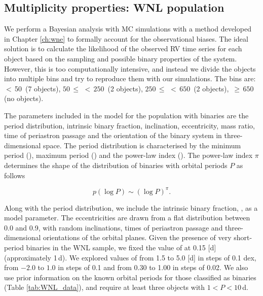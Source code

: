 \subsection{Multiplicity properties: WNL population} \label{sect:WNL_multiplicity}

We perform a Bayesian analysis with MC simulations with a method developed in Chapter \ref{ch:wne} to formally account for the observational biases. The ideal solution is to calculate the likelihood of the observed RV time series for each object based on the sampling and possible binary properties of the system. However, this is too computationally intensive, and instead we divide the objects into multiple \DelRV{} bins and try to reproduce them with our simulations. The \DelRV{} bins are: \DelRV{}\,$<$\,50\,\kms{} (7 objects), $50\,\le\,$\DelRV{}$\,<\,250\,$\kms{} (2 objects), $250\,\le\,$\DelRV{}$\,<\,650\,$\kms{} (2 objects), \DelRV{}\,$\ge\,650\,$\kms{} (no objects).

The parameters included in the model for the population with binaries are the period distribution, intrinsic binary fraction, inclination, eccentricity, mass ratio, time of periastron passage and the orientation of the binary system in three-dimensional space. The period distribution is characterised by the minimum period (\logPminWNL{}), maximum period (\logPmaxWNL) and the power-law index (\piWNL{}). The power-law index $\pi$ determines the shape of the distribution of binaries with orbital periods $P$ as follows

\begin{equation}
    p(\log P) \sim (\log P)^{\pi}.
\end{equation}

Along with the period distribution, we include the intrinsic binary fraction, \fintWNL{}, as a model parameter. The eccentricities are drawn from a flat distribution between 0.0 and 0.9, with random inclinations, times of periastron passage and three-dimensional orientations of the orbital planes. Given the presence of very short-period binaries in the WNL sample, we fixed the value of \logPminWNL{} at 0.15 [d] (approximately 1\,d). We explored values of \logPmaxWNL{} from 1.5 to 5.0 [d] in steps of 0.1 dex, \piWNL{} from $-2.0$ to $1.0$ in steps of 0.1 and \fintWNL{} from 0.30 to 1.00 in steps of 0.02. We also use prior information on the known orbital periods for those classified as binaries (Table \ref{tab:WNL_data}), and require at least three objects with $1<P<10\,$d.

